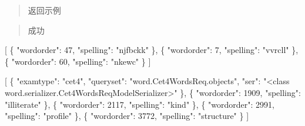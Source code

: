 \documentclass[
]{article}
\newenvironment{Shaded}{}{}
\newcommand{\DataTypeTok}[1]{\textcolor[rgb]{0.56,0.13,0.00}{#1}}
\newcommand{\DecValTok}[1]{\textcolor[rgb]{0.25,0.63,0.44}{#1}}
\newcommand{\FunctionTok}[1]{\textcolor[rgb]{0.02,0.16,0.49}{#1}}
\newcommand{\OtherTok}[1]{\textcolor[rgb]{0.00,0.44,0.13}{#1}}
\newcommand{\StringTok}[1]{\textcolor[rgb]{0.25,0.44,0.63}{#1}}
\begin{document}
\begin{quote}
返回示例
\end{quote}

\begin{quote}
成功
\end{quote}

\begin{Shaded}
\begin{Highlighting}[]
\OtherTok{[}
  \FunctionTok{\{}
    \DataTypeTok{"wordorder"}\FunctionTok{:} \DecValTok{47}\FunctionTok{,}
    \DataTypeTok{"spelling"}\FunctionTok{:} \StringTok{"njfbckk"}
  \FunctionTok{\}}\OtherTok{,}
  \FunctionTok{\{}
    \DataTypeTok{"wordorder"}\FunctionTok{:} \DecValTok{7}\FunctionTok{,}
    \DataTypeTok{"spelling"}\FunctionTok{:} \StringTok{"vvrcll"}
  \FunctionTok{\}}\OtherTok{,}
  \FunctionTok{\{}
    \DataTypeTok{"wordorder"}\FunctionTok{:} \DecValTok{60}\FunctionTok{,}
    \DataTypeTok{"spelling"}\FunctionTok{:} \StringTok{"nkewc"}
  \FunctionTok{\}}
\OtherTok{]}
\end{Highlighting}
\end{Shaded}

\begin{Shaded}
\begin{Highlighting}[]
\OtherTok{[}
  \FunctionTok{\{}
    \DataTypeTok{"examtype"}\FunctionTok{:} \StringTok{"cet4"}\FunctionTok{,}
    \DataTypeTok{"queryset"}\FunctionTok{:} \StringTok{"word.Cet4WordsReq.objects"}\FunctionTok{,}
    \DataTypeTok{"ser"}\FunctionTok{:} \StringTok{"\textless{}class \textquotesingle{}word.serializer.Cet4WordsReqModelSerializer\textquotesingle{}\textgreater{}"}
  \FunctionTok{\}}\OtherTok{,}
  \FunctionTok{\{}
    \DataTypeTok{"wordorder"}\FunctionTok{:} \DecValTok{1909}\FunctionTok{,}
    \DataTypeTok{"spelling"}\FunctionTok{:} \StringTok{"illiterate"}
  \FunctionTok{\}}\OtherTok{,}
  \FunctionTok{\{}
    \DataTypeTok{"wordorder"}\FunctionTok{:} \DecValTok{2117}\FunctionTok{,}
    \DataTypeTok{"spelling"}\FunctionTok{:} \StringTok{"kind"}
  \FunctionTok{\}}\OtherTok{,}
  \FunctionTok{\{}
    \DataTypeTok{"wordorder"}\FunctionTok{:} \DecValTok{2991}\FunctionTok{,}
    \DataTypeTok{"spelling"}\FunctionTok{:} \StringTok{"profile"}
  \FunctionTok{\}}\OtherTok{,}
  \FunctionTok{\{}
    \DataTypeTok{"wordorder"}\FunctionTok{:} \DecValTok{3772}\FunctionTok{,}
    \DataTypeTok{"spelling"}\FunctionTok{:} \StringTok{"structure"}
  \FunctionTok{\}}
\OtherTok{]}
\end{Highlighting}
\end{Shaded}
\end{document}
